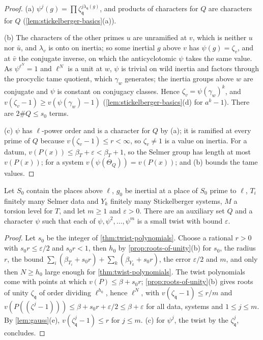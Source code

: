 \begin{proof}
(a) $\psi^j(g)=\prod\zeta_{\mathfrak q}^{j\lambda_{\mathfrak q}(g)}$, and products of characters for $Q$ are characters for $Q$ (\cref{lem:stickelberger-basics}(a)).

(b) The characters of the other primes $u$ are unramified at $v$, which is neither $u$ nor $\bar u$, and $\lambda_v$ is onto on inertia; so some inertial $g$ above $v$ has $\psi(g)=\zeta_v$, and at $\bar v$ the conjugate inverse, on which the anticyclotomic $\psi$ takes the same value. As $\psi^{\ell^N}=1$ and $\ell^N$ is a unit at $w$, $\psi$ is trivial on wild inertia and
factors through the procyclic tame quotient, which $\gamma_w$ generates; the inertia groups above $w$ are conjugate and $\psi$ is constant on conjugacy classes. Hence $\zeta_v=\psi(\gamma_w)^k$, and $v(\zeta_v-1)\ge v(\psi(\gamma_w)-1)$ (\cref{lem:stickelberger-basics}(d) for $a^k-1$). There are $2\#Q\le s_0$ terms.

(c) $\psi$ has $\ell$-power order and is a character for $Q$ by (a); it is ramified at every prime of $Q$ because $v(\zeta_v-1)\le r<\infty$, so $\zeta_v\ne1$ is a value on inertia. For a datum, $v(P(x))\le\beta_T+\varepsilon<\beta_T+1$, so the Selmer group has length at most $v(P(x))$; for a system $v(\psi(\Theta_Q))=v(P(x))$; and (b) bounds the
tame values.
\end{proof}

\begin{theorem}\label{thm:twisting-general}
Let $S_0$ contain the places above $\ell$, $g_0$ be inertial at a place of $S_0$ prime to $\ell$, $T_i$ finitely many Selmer data and $Y_k$ finitely many Stickelberger systems, $M$ a torsion level for $T$, and let $m\ge1$ and $\varepsilon>0$. There
are an auxiliary set $Q$ and a character $\psi$ such that each of $\psi,\psi^2,\dots,\psi^m$ is a small twist with bound $\varepsilon$.
\end{theorem}

\begin{proof}
Let $s_0$ be the integer of \cref{thm:twist-polynomials}. Choose a rational $r>0$ with $s_0r\le\varepsilon/2$ and $s_0r<1$, then $h_0$ by \cref{prop:roots-of-unity}(b) for $s_0$, the radius $r$, the bound $\sum_i(\beta_{T_i}+s_0r)+\sum_k(\beta_{Y_k}+s_0r)$, the error $\varepsilon/2$ and $m$, and only then $N\ge h_0$ large enough for
\cref{thm:twist-polynomials}. The twist polynomials come with points at which $v(P)\le\beta+s_0r$; \cref{prop:roots-of-unity}(b) gives roots of unity $\zeta_{\mathfrak q}$ of order dividing $\ell^{h_0}$, hence $\ell^N$, with $v(\zeta_{\mathfrak q}-1)\le r/m$ and $v(P((\zeta^j-1)))\le\beta+s_0r+\varepsilon/2\le\beta+\varepsilon$ for all data, systems
and $1\le j\le m$. By \cref{lem:gauss}(e), $v(\zeta^j_{\mathfrak q}-1)\le r$ for $j\le m$. (c) for $\psi^j$, the twist by the $\zeta^j_{\mathfrak q}$, concludes.
\end{proof}

